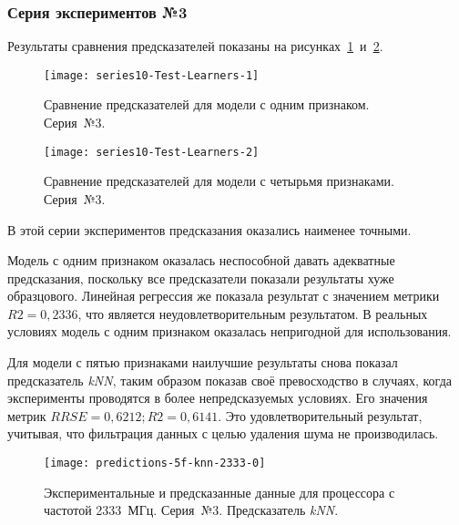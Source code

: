 \subsubsection{Серия экспериментов №3}

Результаты сравнения предсказателей показаны на рисунках~\ref{img:series10-Test-Learners-1}~и~\ref{img:series10-Test-Learners-2}.

\begin{figure}[H]
    \begin{center}
        \texttt{[image: series10-Test-Learners-1]}
        \caption{Сравнение предсказателей для модели с одним признаком. Серия~№3.} %
        \label{img:series10-Test-Learners-1} %
    \end{center}
\end{figure}

\begin{figure}[H]
    \begin{center}
        \texttt{[image: series10-Test-Learners-2]}
        \caption{Сравнение предсказателей для модели с четырьмя признаками. Серия~№3.}
        \label{img:series10-Test-Learners-2}
    \end{center}
\end{figure}

В этой серии экспериментов предсказания оказались наименее точными.

Модель с одним признаком оказалась неспособной давать адекватные предсказания, поскольку все предсказатели показали результаты хуже образцового. Линейная регрессия же показала результат с значением метрики $R2 = 0,2336$, что является неудовлетворительным результатом. В реальных условиях модель с одним признаком оказалась непригодной для использования.

Для модели с пятью признаками наилучшие результаты снова показал предсказатель \textit{kNN}, таким образом показав своё превосходство в случаях, когда эксперименты проводятся в более непредсказуемых условиях. Его значения метрик $RRSE = 0,6212; R2 = 0,6141$. Это удовлетворительный результат, учитывая, что фильтрация данных с целью удаления шума не производилась.

\begin{figure}[H]
    \begin{center}
        \texttt{[image: predictions-5f-knn-2333-0]}
        \caption{Экспериментальные и предсказанные данные для процессора с частотой 2333~МГц. Серия~№3. Предсказатель \textit{kNN}.}
        \label{img:predictions-5f-knn-2333-0}
    \end{center}
\end{figure}

